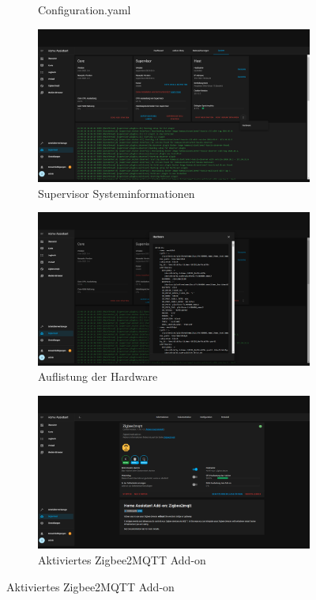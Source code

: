 \begin{figure}[H]
\begin{subfigure}{.5\linewidth}
        \caption{Configuration.yaml}
        \label{fig:ha18}
    \end{subfigure}
    \begin{subfigure}{.5\linewidth}
        \includegraphics[width=1\textwidth]{img/HA23.png}
        \caption{Supervisor Systeminformationen}
        \label{fig:ha19}
    \end{subfigure}
    \begin{subfigure}{.5\linewidth}
        \includegraphics[width=1\textwidth]{img/HA24.png}
        \caption{Auflistung der Hardware}
        \label{fig:ha20}
    \end{subfigure}
    \begin{subfigure}{.5\linewidth}
        \includegraphics[width=1\textwidth]{img/HA21.png}
        \caption{Aktiviertes Zigbee2MQTT Add-on}
        \label{fig:ha17}
    \end{subfigure}
\end{figure}

